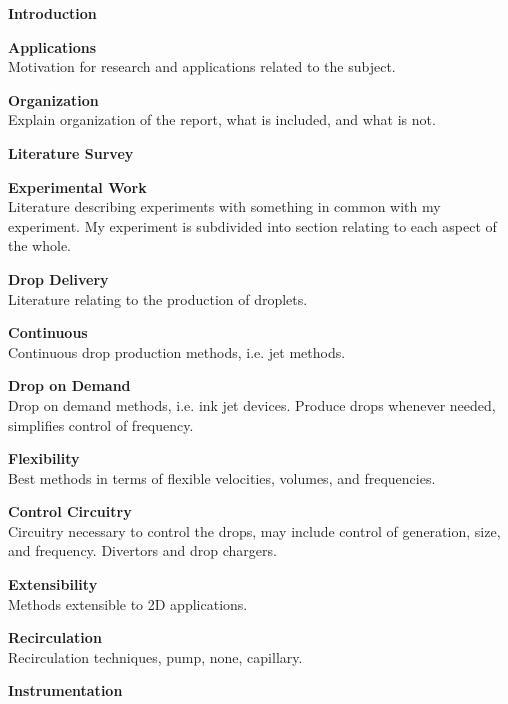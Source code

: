 \documentclass{report}
\begin{document}
\begin{outline}
  \item {\bf Introduction }
  \begin{outline}
    \item {\bf Applications } \\
      Motivation for research and applications related to the
      subject.
    \item {\bf Organization } \\
      Explain organization of the report, what is included, and what
      is not.
  \end{outline}
  \item {\bf Literature Survey }
  \begin{outline}
    \item {\bf Experimental Work } \\
      Literature describing experiments with something in common with
      my experiment.  My experiment is subdivided into section
      relating to each aspect of the whole.
    \begin{outline}
      \item {\bf Drop Delivery } \\
	Literature relating to the production of droplets.
      \begin{outline}
	\item {\bf Continuous } \\
	  Continuous drop production methods, i.e. jet methods.
	\item {\bf Drop on Demand } \\
	  Drop on demand methods, i.e. ink jet devices.  Produce drops
	  whenever needed, simplifies control of frequency.
	\item {\bf Flexibility } \\
	  Best methods in terms of flexible velocities, volumes, and
	  frequencies.
	\item {\bf Control Circuitry } \\
	  Circuitry necessary to control the drops, may include
	  control of generation, size, and frequency.  Divertors and
	  drop chargers.
	\item {\bf Extensibility } \\
	  Methods extensible to 2D applications.
	\item {\bf Recirculation } \\
	  Recirculation techniques, pump, none, capillary.
      \end{outline}
      \item {\bf Instrumentation } \\

\end{outline}
\end{outline}
\end{outline}
\end{document}
